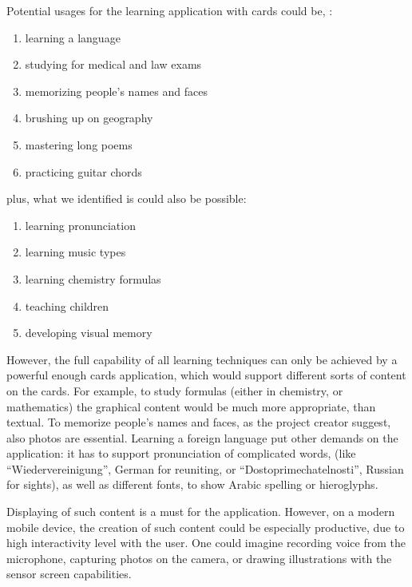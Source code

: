 \documentclass[a4paper,11pt,twoside]{article}
\begin{document}
Potential usages for the learning application with cards could be, \citet{ankinet}:
\begin{enumerate}
  \item learning a language
  \item studying for medical and law exams
  \item memorizing people's names and faces
  \item brushing up on geography
  \item mastering long poems
  \item practicing guitar chords
\end{enumerate}
plus, what we identified is could also be possible:
\begin{enumerate}
  \item learning pronunciation
  \item learning music types 
  \item learning chemistry formulas
  \item teaching children
  \item developing visual memory
\end{enumerate}

However, the full capability of all learning techniques can only be achieved by a powerful enough cards
application, which would support different sorts of content on the cards. For example, to study formulas
(either in chemistry, or mathematics) the graphical content would be much more appropriate, than textual.
To memorize people's names and faces, as the project creator suggest, also photos are essential. Learning
a foreign language put other demands on the application: it has to support pronunciation of complicated words,
(like ``Wiedervereinigung'', German for reuniting, or ``Dostoprimechatelnosti'', Russian for sights), as well 
as different fonts, to show Arabic spelling or hieroglyphs.


Displaying of such content is a must for the application. However, on a modern mobile device, the creation 
of such content could be especially productive, due to high interactivity level with the user. One could imagine
recording voice from the microphone, capturing photos on the camera, or drawing illustrations with the sensor 
screen capabilities.
\end{document}
